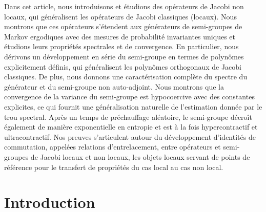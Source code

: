 \documentclass[JEP,XML,SOM,Unicode]{cedram}
\theoremstyle{plain}
\theoremstyle{definition}
\begin{document}


\begin{altabstract}
Dans cet article, nous introduisons et étudions des opérateurs de Jacobi non locaux, qui généralisent les opérateurs de Jacobi classiques (locaux). Nous montrons que ces opérateurs s'étendent aux générateurs de semi-groupes de Markov ergodiques avec des mesures de probabilité invariantes uniques et étudions leurs propriétés spectrales et de convergence. En particulier, nous dérivons un développement en série du semi-groupe en termes de polynômes explicitement définis, qui généralisent les polynômes orthogonaux de Jacobi classiques. De plus, nous donnons une caractérisation complète du spectre du générateur et du semi-groupe non auto-adjoint. Nous montrons que la convergence de la variance du semi-groupe est hypocoercive avec des constantes explicites, ce qui fournit une généralisation naturelle de l'estimation donnée par le trou spectral. Après un temps de préchauffage aléatoire, le semi-groupe décroît également de manière exponentielle en entropie et est à la fois hypercontractif et ultracontractif. Nos preuves s'articulent autour du développement d'identités de commutation, appelées relations d'entrelacement, entre opérateurs et semi-groupes de Jacobi locaux et non locaux, les objets locaux servant de points de référence pour le transfert de propriétés du cas local au cas non local.
\end{altabstract}

\maketitle
\enlargethispage{-1.5\baselineskip}%
\tableofcontents
\mainmatter
\section{Introduction}
\end{document}
